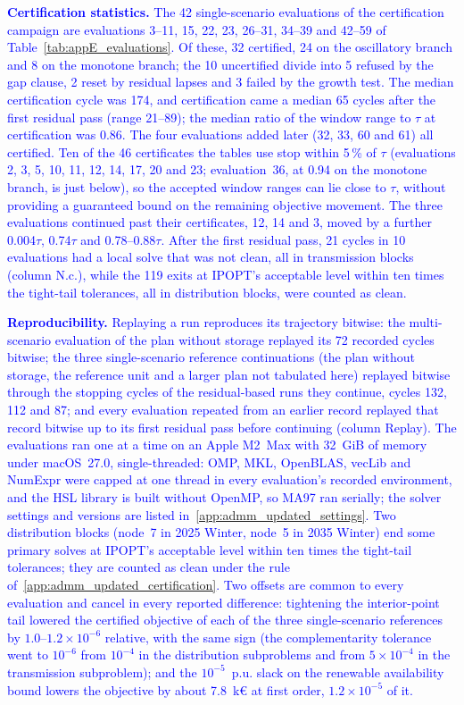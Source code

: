 \documentclass[preprint,12pt]{elsarticle}
\begin{document}
\textcolor{blue}{
    \textbf{Certification statistics.} The 42 single-scenario evaluations of the certification campaign are evaluations 3--11, 15, 22, 23, 26--31, 34--39 and 42--59 of Table~\ref{tab:appE_evaluations}. Of these, 32 certified, 24 on the oscillatory branch and 8 on the monotone branch; the 10 uncertified divide into 5 refused by the gap clause, 2 reset by residual lapses and 3 failed by the growth test. The median certification cycle was 174, and certification came a median 65 cycles after the first residual pass (range 21--89); the median ratio of the window range to $\tau$ at certification was 0.86. The four evaluations added later (32, 33, 60 and 61) all certified. Ten of the 46 certificates the tables use stop within 5\,\% of $\tau$ (evaluations 2, 3, 5, 10, 11, 12, 14, 17, 20 and 23; evaluation~36, at 0.94 on the monotone branch, is just below), so the accepted window ranges can lie close to $\tau$, without providing a guaranteed bound on the remaining objective movement. The three evaluations continued past their certificates, 12, 14 and 3, moved by a further 0.004$\tau$, 0.74$\tau$ and 0.78--0.88$\tau$. After the first residual pass, 21 cycles in 10 evaluations had a local solve that was not clean, all in transmission blocks (column N.c.), while the 119 exits at IPOPT's acceptable level within ten times the tight-tail tolerances, all in distribution blocks, were counted as clean.
}

\textcolor{blue}{
    \textbf{Reproducibility.} Replaying a run reproduces its trajectory bitwise: the multi-scenario evaluation of the plan without storage replayed its 72 recorded cycles bitwise; the three single-scenario reference continuations (the plan without storage, the reference unit and a larger plan not tabulated here) replayed bitwise through the stopping cycles of the residual-based runs they continue, cycles 132, 112 and 87; and every evaluation repeated from an earlier record replayed that record bitwise up to its first residual pass before continuing (column Replay). The evaluations ran one at a time on an Apple M2~Max with 32~GiB of memory under macOS~27.0, single-threaded: OMP, MKL, OpenBLAS, vecLib and NumExpr were capped at one thread in every evaluation's recorded environment, and the HSL library is built without OpenMP, so MA97 ran serially; the solver settings and versions are listed in~\ref{app:admm_updated_settings}. Two distribution blocks (node~7 in 2025 Winter, node~5 in 2035 Winter) end some primary solves at IPOPT's acceptable level within ten times the tight-tail tolerances; they are counted as clean under the rule of~\ref{app:admm_updated_certification}. Two offsets are common to every evaluation and cancel in every reported difference: tightening the interior-point tail lowered the certified objective of each of the three single-scenario references by $1.0$--$1.2 \times 10^{-6}$ relative, with the same sign (the complementarity tolerance went to $10^{-6}$ from $10^{-4}$ in the distribution subproblems and from $5 \times 10^{-4}$ in the transmission subproblem); and the $10^{-5}$~p.u. slack on the renewable availability bound lowers the objective by about 7.8~k\euro{} at first order, $1.2 \times 10^{-5}$ of it.
}
\end{document}
